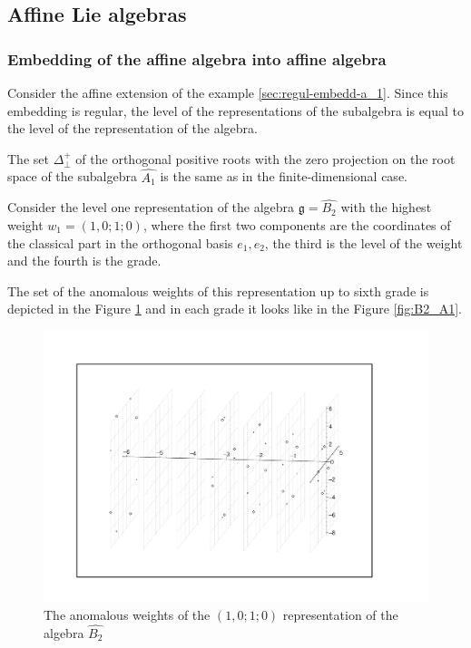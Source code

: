 \documentclass[a4paper,12pt]{article}
\theoremstyle{definition} \newtheorem{Def}{Definition}
\begin{document}
\subsection{Affine Lie algebras}
\label{sec:affine-lie-algebras}
\subsubsection{Embedding of the affine algebra into affine algebra}
\label{sec:embedd-affine-algebr}

Consider the affine extension of the example \ref{sec:regul-embedd-a_1}.
Since this embedding is regular, the level of the representations of the subalgebra is equal to the level of the representation of the algebra.

The set $\Delta^{+}_{\bot}$ of the orthogonal positive roots with the zero projection on the root space of the subalgebra $\hat{A_1}$ is the same as in the finite-dimensional case.

Consider the level one representation of the algebra $\mathfrak{g}=\hat{B_2}$ with the highest weight $w_1=(1,0;1;0)$, where the first two components are the coordinates of the classical part in the orthogonal basis $e_1,e_2$, the third is the level of the weight and the fourth is the grade.

The set of the anomalous weights of this representation up to sixth grade is depicted in the Figure \ref{fig:affine_B2_anom_point} and in each grade it looks like in the Figure \ref{fig:B2_A1}.

\begin{figure}[h!tb]
  \includegraphics[width=160mm]{AffineB2_A1_Anom.pdf}
  \caption{The anomalous weights of the $(1,0;1;0)$ representation of the algebra $\hat{B_2}$}
  \label{fig:affine_B2_anom_point}
\end{figure}
\end{document}
